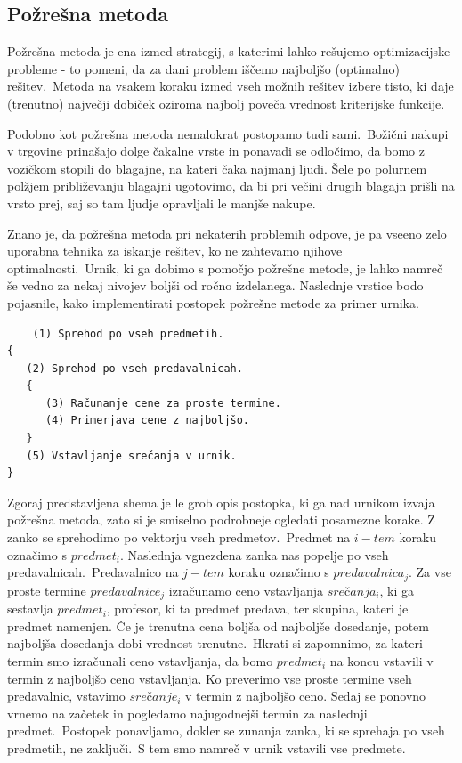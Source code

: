 \documentclass[a4paper,10pt]{article}
\begin{document}
\subsection{Požrešna metoda} %

Požrešna metoda je ena izmed strategij, s katerimi lahko rešujemo optimizacijske probleme -
to pomeni, da za dani problem iščemo najboljšo (optimalno) rešitev.\ Metoda na vsakem koraku
izmed vseh možnih rešitev izbere  tisto, ki daje (trenutno) največji dobiček oziroma najbolj
poveča vrednost kriterijske funkcije.

Podobno kot požrešna metoda nemalokrat postopamo tudi sami.\ Božični nakupi v trgovine
prinašajo dolge čakalne vrste in ponavadi se odločimo, da bomo z vozičkom stopili do blagajne,
na kateri čaka najmanj ljudi. Šele po polurnem polžjem približevanju blagajni ugotovimo,
da bi pri večini drugih blagajn prišli na vrsto prej, saj so tam ljudje opravljali le
manjše nakupe.

Znano je, da požrešna metoda pri nekaterih problemih odpove, je pa vseeno zelo uporabna
tehnika za iskanje rešitev, ko ne zahtevamo njihove optimalnosti.\ Urnik, ki ga dobimo s
pomočjo požrešne metode, je lahko namreč še vedno za nekaj nivojev boljši od ročno izdelanega.
Naslednje vrstice bodo pojasnile, kako implementirati postopek požrešne metode za primer urnika.

\begin{verbatim}
	(1) Sprehod po vseh predmetih.
{
   (2) Sprehod po vseh predavalnicah.
   {
      (3) Računanje cene za proste termine.
      (4) Primerjava cene z najboljšo.
   }
   (5) Vstavljanje srečanja v urnik.
}
\end{verbatim}

Zgoraj predstavljena shema je le grob opis postopka, ki ga nad urnikom izvaja požrešna metoda,
zato si je smiselno podrobneje ogledati posamezne korake.
%
   Z zanko se sprehodimo po vektorju vseh predmetov.\ Predmet na $i-tem$ koraku
   označimo s $predmet_i$.
%
   Naslednja vgnezdena zanka nas popelje po vseh predavalnicah.\ Predavalnico na
   $j-tem$ koraku označimo s $predavalnica_j$.
%
   Za vse proste termine $predavalnice_j$ izračunamo ceno vstavljanja
   $srečanja_i$, ki ga sestavlja $predmet_i$, profesor, ki ta predmet predava,
   ter skupina, kateri je predmet namenjen.
%
   Če je trenutna cena boljša od najboljše dosedanje, potem najboljša dosedanja
   dobi vrednost trenutne.\ Hkrati si zapomnimo, za kateri termin smo izračunali ceno
   vstavljanja, da bomo $predmet_i$ na koncu vstavili v termin z najboljšo
   ceno vstavljanja.
   Ko preverimo vse proste termine vseh predavalnic, vstavimo $srečanje_i$
   v termin z najboljšo ceno.
%
   Sedaj se ponovno vrnemo na začetek in pogledamo najugodnejši termin za naslednji
   predmet.\ Postopek ponavljamo, dokler se zunanja zanka, ki se sprehaja po vseh predmetih,
   ne zaključi.\ S tem smo namreč v urnik vstavili vse predmete.
\end{document}
